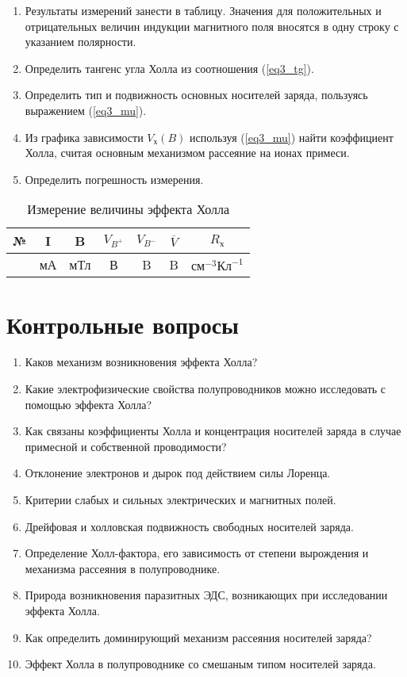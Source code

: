 \begin{enumerate}
\item Результаты измерений занести в таблицу. Значения для положительных и отрицательных величин индукции магнитного поля вносятся в одну строку с указанием полярности.
\item Определить тангенс угла Холла из соотношения (\ref{eq3_tg}).
\item Определить тип и подвижность основных носителей заряда, пользуясь выражением (\ref{eq3_mu}).
\item Из графика зависимости $V_{\text{х}} (B)$ используя (\ref{eq3_mu}) найти коэффициент Холла, считая основным механизмом рассеяние на ионах примеси.
\item Определить погрешность измерения.
\end{enumerate}

\begin{table}[h!]
\caption{Измерение величины эффекта Холла}
\begin{center}
\begin{tabular}{c|c|c|c|c|c|c}
№ & I & B & $V_{B^{+}}$ & $V_{B^{-}}$ & $\overline{V}$ & $R_{\text{х}}$ \\
\hline
& мА & мТл & В & B & B & $\text{см}^{-3}\text{Кл}^{-1}$ \\
\hline
\end{tabular}
\end{center}
\end{table}

\section{Контрольные вопросы}

\begin{enumerate}
\item Каков механизм возникновения эффекта Холла?
\item Какие электрофизические свойства полупроводников можно исследовать с помощью эффекта Холла?
\item Как связаны коэффициенты Холла и концентрация носителей заряда в случае примесной и собственной проводимости?
\item Отклонение электронов и дырок под действием силы Лоренца.
\item Критерии слабых и сильных электрических и магнитных полей.
\item Дрейфовая и холловская подвижность свободных носителей заряда.
\item Определение Холл-фактора, его зависимость от степени вырождения и механизма рассеяния в полупроводнике.
\item Природа возникновения паразитных ЭДС, возникающих при исследовании эффекта Холла.
\item Как определить доминирующий механизм рассеяния носителей заряда?
\item Эффект Холла в полупроводнике со смешаным типом носителей заряда.
\end{enumerate}

